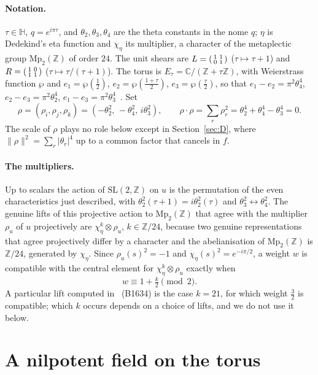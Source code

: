 \documentclass[11pt]{article}
\theoremstyle{remark}
\newcommand{\SL}{\mathrm{SL}}
\newcommand{\Mp}{\mathrm{Mp}}
\newcommand{\Z}{\mathbb{Z}}
\newcommand{\C}{\mathbb{C}}
\newcommand{\Hb}{\mathbb{H}}
\begin{document}
\paragraph{Notation.} $\tau\in\Hb$, $q=e^{i\pi\tau}$, and $\theta_2,\theta_3,\theta_4$ are the theta constants in the nome $q$;
$\eta$ is Dedekind's eta function and $\chi_\eta$ its multiplier, a character of the metaplectic group $\Mp_2(\Z)$ of order
$24$. The unit shears are $L=\begin{psmallmatrix}1&1\\0&1\end{psmallmatrix}$ ($\tau\mapsto\tau+1$) and
$R=\begin{psmallmatrix}1&0\\1&1\end{psmallmatrix}$ ($\tau\mapsto\tau/(\tau+1)$). The torus is $E_\tau=\C/(\Z+\tau\Z)$, with
Weierstrass function $\wp$ and $e_1=\wp(\tfrac12)$, $e_2=\wp(\tfrac{1+\tau}2)$, $e_3=\wp(\tfrac\tau2)$, so that
$e_1-e_2=\pi^2\theta_4^4$, $e_2-e_3=\pi^2\theta_2^4$, $e_1-e_3=\pi^2\theta_3^4$~\cite{WhittakerWatson1927}. Set
\[
  \rho=(\rho_i,\rho_j,\rho_k)=(-\theta_2^2,\,-\theta_4^2,\,i\theta_3^2),\qquad \rho\cdot\rho=\textstyle\sum_r\rho_r^2=\theta_2^4+\theta_4^4-\theta_3^4=0 .
\]
The scale of $\rho$ plays no role below except in Section~\ref{sec:D}, where $\|\rho\|^2=\sum_r|\theta_r|^4$ up to a common
factor that cancels in $f$.

\paragraph{The multipliers.} Up to scalars the action of $\SL(2,\Z)$ on $u$ is the permutation of the even
characteristics just described, with $\theta_2^2(\tau+1)=i\theta_2^2(\tau)$ and $\theta_3^2\leftrightarrow\theta_4^2$. The genuine
lifts of this projective action to $\Mp_2(\Z)$ that agree with the multiplier $\rho_u$ of $u$ projectively are
$\chi_\eta^k\otimes\rho_u$, $k\in\Z/24$, because two genuine representations that agree projectively differ by a character
and the abelianisation of $\Mp_2(\Z)$ is $\Z/24$, generated by $\chi_\eta$. Since $\rho_u(s)^2=-1$ and $\chi_\eta(s)^2=e^{-i\pi/2}$,
a weight $w$ is compatible with the central element for $\chi_\eta^k\otimes\rho_u$ exactly when
\[
  w\equiv1+\tfrac k2\pmod 2 .
\]
A particular lift computed in~\cite{OriginAxiomRepo} (B1634) is the case $k=21$, for which weight $\tfrac32$ is
compatible; which $k$ occurs depends on a choice of lifts, and we do not use it below.

\section{A nilpotent field on the torus}\label{sec:nil}
\end{document}
